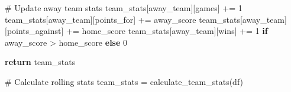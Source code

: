 \documentclass[
  letterpaper,
  DIV=11,
  numbers=noendperiod]{scrartcl}
\newenvironment{Shaded}{\begin{snugshade}}{\end{snugshade}}
\newcommand{\CommentTok}[1]{\textcolor[rgb]{0.37,0.37,0.37}{#1}}
\newcommand{\ControlFlowTok}[1]{\textcolor[rgb]{0.00,0.23,0.31}{\textbf{#1}}}
\newcommand{\DecValTok}[1]{\textcolor[rgb]{0.68,0.00,0.00}{#1}}
\newcommand{\NormalTok}[1]{\textcolor[rgb]{0.00,0.23,0.31}{#1}}
\newcommand{\OperatorTok}[1]{\textcolor[rgb]{0.37,0.37,0.37}{#1}}
\newcommand{\StringTok}[1]{\textcolor[rgb]{0.13,0.47,0.30}{#1}}
\begin{document}
\begin{Shaded}
\begin{Highlighting}[]
        \CommentTok{\# Update away team stats}
\NormalTok{        team\_stats[away\_team][}\StringTok{\textquotesingle{}games\textquotesingle{}}\NormalTok{] }\OperatorTok{+=} \DecValTok{1}
\NormalTok{        team\_stats[away\_team][}\StringTok{\textquotesingle{}points\_for\textquotesingle{}}\NormalTok{] }\OperatorTok{+=}\NormalTok{ away\_score}
\NormalTok{        team\_stats[away\_team][}\StringTok{\textquotesingle{}points\_against\textquotesingle{}}\NormalTok{] }\OperatorTok{+=}\NormalTok{ home\_score}
\NormalTok{        team\_stats[away\_team][}\StringTok{\textquotesingle{}wins\textquotesingle{}}\NormalTok{] }\OperatorTok{+=} \DecValTok{1} \ControlFlowTok{if}\NormalTok{ away\_score }\OperatorTok{\textgreater{}}\NormalTok{ home\_score }\ControlFlowTok{else} \DecValTok{0}
    
    \ControlFlowTok{return}\NormalTok{ team\_stats}

\CommentTok{\# Calculate rolling stats}
\NormalTok{team\_stats }\OperatorTok{=}\NormalTok{ calculate\_team\_stats(df)}


\end{Highlighting}
\end{Shaded}
\end{document}
